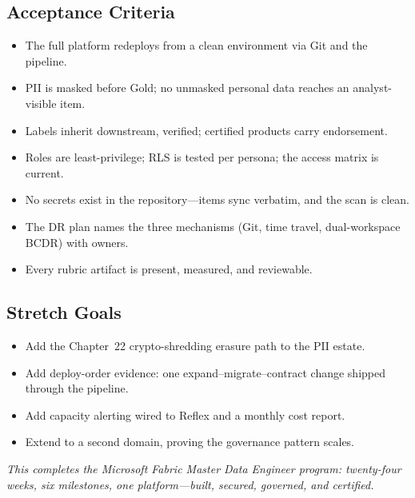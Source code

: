 \subsection*{Acceptance Criteria}
\begin{itemize}
    \item[\(\square\)] The full platform redeploys from a clean environment via Git and the pipeline.
    \item[\(\square\)] PII is masked before Gold; no unmasked personal data reaches an analyst-visible item.
    \item[\(\square\)] Labels inherit downstream, verified; certified products carry endorsement.
    \item[\(\square\)] Roles are least-privilege; RLS is tested per persona; the access matrix is current.
    \item[\(\square\)] No secrets exist in the repository---items sync verbatim, and the scan is clean.
    \item[\(\square\)] The DR plan names the three mechanisms (Git, time travel, dual-workspace BCDR) with owners.
    \item[\(\square\)] Every rubric artifact is present, measured, and reviewable.
\end{itemize}

\subsection*{Stretch Goals}
\begin{itemize}
    \item Add the Chapter~22 crypto-shredding erasure path to the PII estate.
    \item Add deploy-order evidence: one expand--migrate--contract change shipped through the pipeline.
    \item Add capacity alerting wired to Reflex and a monthly cost report.
    \item Extend to a second domain, proving the governance pattern scales.
\end{itemize}

\vspace{4mm}
\noindent\emph{This completes the Microsoft Fabric Master Data Engineer program: twenty-four weeks, six milestones, one platform---built, secured, governed, and certified.}
